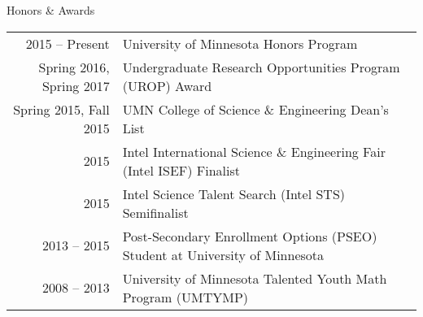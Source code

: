 \begin{rSection}{Honors \& Awards}

  \begin{tabularx}{\linewidth}{r|X}
    2015 -- Present & University of Minnesota Honors Program \\
    Spring 2016, Spring 2017 & Undergraduate Research Opportunities Program (UROP) Award \\
    Spring 2015, Fall 2015 & UMN College of Science \& Engineering Dean's List \\
    2015 & Intel International Science \& Engineering Fair (Intel ISEF) Finalist \\
    2015 & Intel Science Talent Search (Intel STS) Semifinalist \\
    2013 -- 2015 & Post-Secondary Enrollment Options (PSEO) Student at University of Minnesota\\
    2008 -- 2013 & University of Minnesota Talented Youth Math Program (UMTYMP)
  \end{tabularx}
\end{rSection}
